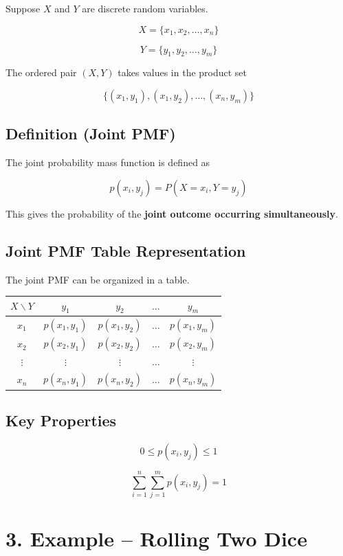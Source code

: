 \documentclass[12pt]{article}
\begin{document}
Suppose $X$ and $Y$ are discrete random variables.

\[
X = \{x_1, x_2, \ldots, x_n\}
\]

\[
Y = \{y_1, y_2, \ldots, y_m\}
\]

The ordered pair $(X,Y)$ takes values in the product set

\[
\{(x_1,y_1), (x_1,y_2), \ldots, (x_n,y_m)\}
\]

\subsection*{Definition (Joint PMF)}

The joint probability mass function is defined as

\[
p(x_i,y_j) = P(X=x_i, Y=y_j)
\]

This gives the probability of the \textbf{joint outcome occurring simultaneously}.

\subsection*{Joint PMF Table Representation}

The joint PMF can be organized in a table.

\begin{center}
\begin{tabular}{c c c c c}
\toprule
$X\backslash Y$ & $y_1$ & $y_2$ & $\dots$ & $y_m$ \\
\midrule
$x_1$ & $p(x_1,y_1)$ & $p(x_1,y_2)$ & $\dots$ & $p(x_1,y_m)$ \\
$x_2$ & $p(x_2,y_1)$ & $p(x_2,y_2)$ & $\dots$ & $p(x_2,y_m)$ \\
$\vdots$ & $\vdots$ & $\vdots$ & $\dots$ & $\vdots$ \\
$x_n$ & $p(x_n,y_1)$ & $p(x_n,y_2)$ & $\dots$ & $p(x_n,y_m)$ \\
\bottomrule
\end{tabular}
\end{center}

\subsection*{Key Properties}

\[
0 \le p(x_i,y_j) \le 1
\]

\[
\sum_{i=1}^{n} \sum_{j=1}^{m} p(x_i,y_j) = 1
\]

\section*{3. Example -- Rolling Two Dice}
\end{document}
